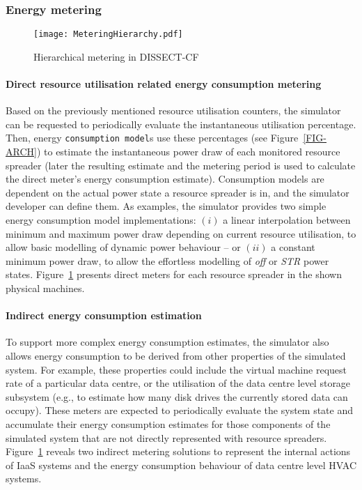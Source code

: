 \documentclass[sort, compress, 5p]{elsarticle}
\begin{document}
\subsubsection{Energy metering} \label{SEC-ENMET}
\begin{figure}[tb]
\centering
\texttt{[image: MeteringHierarchy.pdf]}
\caption{Hierarchical metering in DISSECT-CF\label{FIG-METERS}}
\end{figure}

\paragraph{Direct resource utilisation related energy consumption metering} Based on the previously mentioned resource utilisation counters, the simulator can be requested to periodically evaluate the instantaneous utilisation percentage. Then, energy \verb+consumption model+s use these percentages (see Figure~\ref{FIG-ARCH}) to estimate the instantaneous power draw of each monitored resource spreader (later the resulting estimate and the metering period is used to calculate the direct meter's energy consumption estimate). Consumption models are dependent on the actual power state a resource spreader is in, and the simulator developer can define them. As examples, the simulator provides two simple energy consumption model implementations: $(i)$ a linear interpolation between minimum and maximum power draw depending on current resource utilisation, to allow basic modelling of  dynamic power behaviour -- or $(ii)$ a constant minimum power draw, to allow the effortless modelling of \emph{off} or \emph{STR} power states. Figure~\ref{FIG-METERS} presents direct meters for each resource spreader in the shown physical machines.

\paragraph{Indirect energy consumption estimation} To support more complex energy consumption estimates, the simulator also allows energy consumption to be derived from other properties of the simulated system. For example, these properties could include the virtual machine request rate of a particular data centre, or the utilisation of the data centre level storage subsystem (e.g., to estimate how many disk drives the currently stored data can occupy). These meters are expected to periodically evaluate the system state and accumulate their energy consumption estimates for those components of the simulated system that are not directly represented with resource spreaders. Figure~\ref{FIG-METERS} reveals two indirect metering solutions to represent the internal actions of IaaS systems and the energy consumption behaviour of data centre level HVAC systems.
\end{document}
